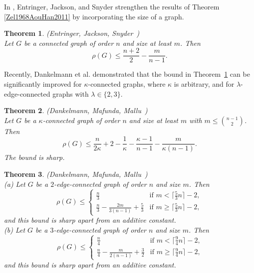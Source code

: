 \documentclass[a4paper,11pt]{article}
\newtheorem{theorem}{Theorem}[section]
\begin{document}
In \cite{EntJacSny1976}, Entringer, Jackson, and Snyder strengthen the results of Theorem \ref{Zel1968AouHan2011} by incorporating the size of a graph.

\begin{theorem}\label{EntJacSny1976}
{\rm (Entringer, Jackson, Snyder~\cite{EntJacSny1976})}\\
Let $G$ be a connected graph of order $n$ and size at least $m$. Then
\[
\rho(G) \leq \frac{n+2}{2} - \frac{m}{n-1}.
\]
\end{theorem}

Recently, Dankelmann et al. \cite{DanMafMal2025} demonstrated that the bound in Theorem~\ref{EntJacSny1976} can be significantly improved for $\kappa$-connected graphs, where $\kappa$ is arbitrary, and for $\lambda$-edge-connected graphs with $\lambda \in \{2,3\}$. 



\begin{theorem}
{\rm (Dankelmann, Mafunda, Mallu~\cite{DanMafMal2025})}\\
Let $G$ be a $\kappa$-connected graph of order $n$ and size at least $m$ with $m \leq \binom{n-1}{2}$. Then 
\begin{equation*} 
\rho(G) \leq \frac{n}{2\kappa} +2 - \frac{1}{\kappa} - \frac{\kappa-1}{n-1} - \frac{m}{\kappa(n-1)}.
\end{equation*}
The bound is sharp. 
\end{theorem}



\begin{theorem}
{\rm (Dankelmann, Mafunda, Mallu~\cite{DanMafMal2025})}\\
(a) Let $G$ be a $2$-edge-connected graph of order $n$ and size $m$. 
Then
\[ \rho(G) \leq \left\{ \begin{array}{cc}
   \frac{n}{3} & \textrm{if $m <\lceil \frac{5}{3}n \rceil -2$,} \\
   \frac{n}{3} - \frac{2m}{3(n-1)} +\frac{5}{3} 
         & \textrm{if $m  \geq \lceil \frac{5}{3}n \rceil -2$},
      \end{array} \right. \]
and this bound is sharp apart from an additive constant. \\
(b) Let $G$ be a $3$-edge-connected graph of order $n$ and size $m$. 
Then
\[ \rho(G) \leq \left\{ \begin{array}{cc}
   \frac{n}{4} & \textrm{if $m < \lceil \frac{9}{4}n\rceil -2$,} \\
   \frac{n}{4} - \frac{m}{2(n-1)} + \frac{3}{2} 
        & \textrm{if $m \geq \lceil \frac{9}{4}n\rceil -2$,}
      \end{array} \right. \]
and this bound is sharp apart from an additive constant. 
\end{theorem}
\end{document}
